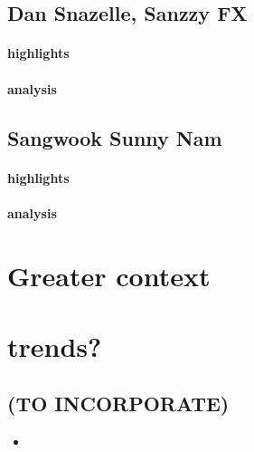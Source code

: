 \subsection{Dan Snazelle, Sanzzy FX}
\paragraph{highlights}
\paragraph{analysis}

\subsection{Sangwook Sunny Nam}

\paragraph{highlights}
\paragraph{analysis}

\section{Greater context}

\section{trends?}

\begin{unsortedStuff}	
\section*{(TO INCORPORATE)}
	\begin{itemize}
		\item 
	\end{itemize}
\end{unsortedStuff}
		
\begin{optBlankSpace}
	\newpage
	\mbox{}
\end{optBlankSpace}

